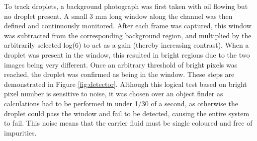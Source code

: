 \documentclass{physics_article_B}
\begin{document}
                To track droplets, a background photograph was first taken with oil flowing but no droplet present. A small 3 mm long window along the channel was then defined and continuously monitored. After each frame was captured, this window was subtracted from the corresponding background region, and multiplied by the arbitrarily selected log(6) to act as a gain (thereby increasing contrast). When a droplet was present in the window, this resulted in bright regions due to the two images being very different. Once an arbitrary threshold of bright pixels was reached, the droplet was confirmed as being in the window. These steps are demonstrated in Figure \ref{fig:detector}. Although this logical test based on bright pixel number is sensitive to noise, it was chosen over an object finder as calculations had to be performed in under 1/30 of a second, as otherwise the droplet could pass the window and fail to be detected, causing the entire system to fail. This noise means that the carrier fluid must be single coloured and free of impurities. \\
            
\end{document}
